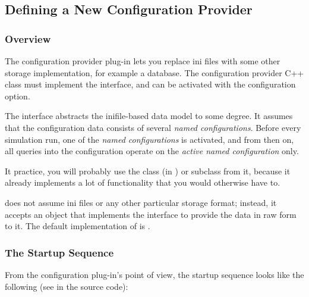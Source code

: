 \subsection{Defining a New Configuration Provider}
\label{sec:plugin-exts:configuration}

\subsubsection{Overview}

The configuration provider plug-in lets you replace ini files
with some other storage implementation, for example a database.
The configuration provider C++ class must implement the
 interface, and can be activated with
the  configuration option.

The  interface abstracts the inifile-based
data model to some degree. It assumes that the configuration data
consists of several \textit{named configurations}. Before every
simulation run, one of the \textit{named configurations} is
activated, and from then on, all queries into the configuration
operate on the \textit{active named configuration} only.

It practice, you will probably use the 
class (in ) or subclass from it, because it already
implements a lot of functionality that you would otherwise have to.

 does not assume ini files or
any other particular storage format; instead, it accepts
an object that implements the 
interface to provide the data in raw form to it.
The default implementation of  is
.

\subsubsection{The Startup Sequence}

From the configuration plug-in's point of view, the startup sequence
looks like the following (see  in the source code):

